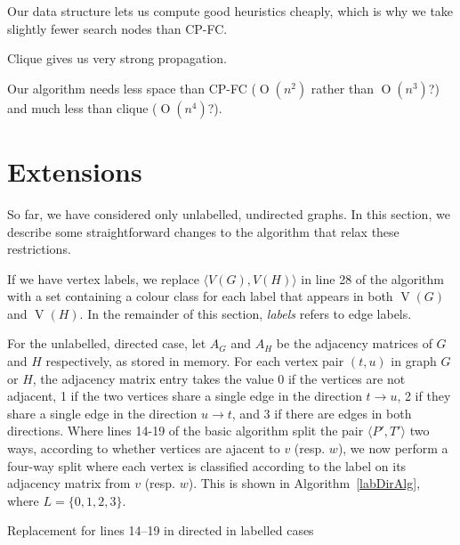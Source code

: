 \documentclass[letterpaper]{article}
\DeclareMathOperator{\V}{V}
\newcommand{\BigO}[1]{\ensuremath{\operatorname{O}\left(#1\right)}}
\begin{document}
Our data structure lets us compute good heuristics cheaply, which is why we take
slightly fewer search nodes than CP-FC.

Clique gives us very strong propagation.

Our algorithm needs less space than CP-FC ($\BigO{n^2}$ rather than $\BigO{n^3}$?) and
much less than clique ($\BigO{n^4}$?).

\section{Extensions}

So far, we have considered only unlabelled, undirected graphs. In this section, we
describe some straightforward changes to the algorithm that relax these restrictions.

If we have vertex labels, we replace ${\langle V(G),V(H) \rangle}$ in line 28 of
the algorithm with a set containing a colour class for each label that appears in
both $\V(G)$ and $\V(H)$. In the remainder of this section, \textit{labels} refers to
edge labels.

For the unlabelled, directed case, let $A_G$ and $A_H$ be the adjacency matrices
of $G$ and $H$ respectively, as stored in memory. For each
vertex pair $(t,u)$ in graph $G$ or $H$, the adjacency matrix entry 
takes the value 0 if the vertices are
not adjacent, 1 if the two vertices share a single edge in the direction $t
\rightarrow u$, 2 if they share a single edge in the direction $u \rightarrow
t$, and 3 if there are edges in both directions. Where lines 14-19 of the
basic algorithm split the pair $\langle P',T' \rangle$ two ways, according to whether
vertices are ajacent to $v$ (resp. $w$), we now perform a four-way split where
each vertex is classified according to the label on its adjacency matrix from $v$
(resp. $w$). This is shown in Algorithm~\ref{labDirAlg}, where $L=\{0,1,2,3\}$.

\begin{algorithm}
\DontPrintSemicolon
\nl    {}
\caption{Replacement for lines 14--19 in directed in labelled cases}
\label{labDirAlg}
\end{algorithm}
\end{document}
